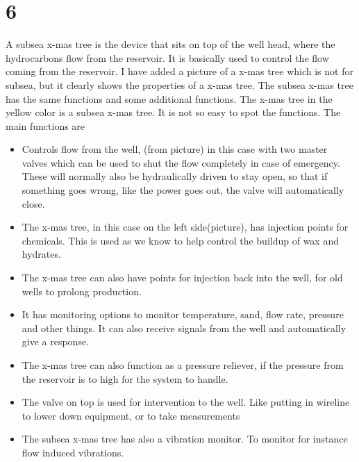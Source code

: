 \documentclass[DIV=calc, paper=a4, fontsize=13pt, twocolumn]{scrartcl}	 %
\begin{document}
\section*{6}
A subsea x-mas tree is the device that sits on top of the well head, where the hydrocarbons flow from the reservoir. It is basically used to control the flow coming from the reservoir. I have added a picture of a x-mas tree which is not for subsea, but it clearly shows the properties of a x-mas tree. The subsea x-mas tree has the same functions and some additional functions. The x-mas tree in the yellow color is a subsea x-mas tree. It is not so easy to spot the functions. The main functions are
\begin{itemize}
\item Controls flow from the well, (from picture) in this case with two master valves which can be used to shut the flow completely in case of emergency. These will normally also be hydraulically driven to stay open, so that if something goes wrong, like the power goes out, the valve will automatically close. 
\item The x-mas tree, in this case on the left side(picture), has injection points for chemicals. This is used as we know to help control the buildup of wax and hydrates.
\item The x-mas tree can also have points for injection back into the well, for old wells to prolong production.
\item It has monitoring options to monitor temperature, sand, flow rate, pressure and other things. It can also receive signals from the well and automatically give a response.
\item The x-mas tree can also function as a pressure reliever, if the pressure from the reservoir is to high for the system to handle.
\item The valve on top is used for intervention to the well. Like putting in wireline to lower down equipment, or to take measurements 
\item The subsea x-mas tree has also a vibration monitor. To monitor for instance flow induced vibrations.
\end{itemize}
\end{document}
